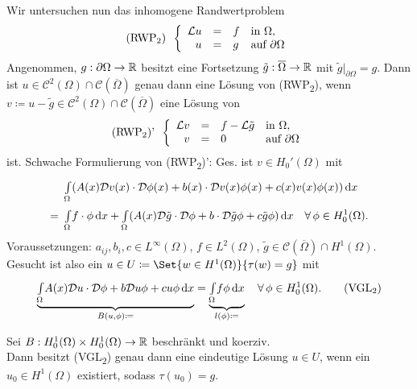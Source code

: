 \documentclass{cheat-sheet}
\newcommand{\Cont}{\mathcal{C}} %
\newcommand{\clos}[1]{\overline{#1}} %
\newcommand{\cOmega}{\clos{\Omega}} %
\newcommand{\bOmega}{\partial \Omega} %
\newcommand{\LL}{\mathcal{L}} %
\newcommand{\tss}[1]{\textsubscript{#1}} %
\newcommand{\DO}{\mathcal{D}} %
\begin{document}
\begin{prob}
  Wir untersuchen nun das inhomogene Randwertproblem
  \[
    \text{(RWP\tss{2})} \enspace
    \left\{ \begin{array}{r c l l}
      \LL u & = & f & \text{in } \Omega, \\
      u & = & g & \text{auf } \bOmega
    \end{array} \right.
  \]
  Angenommen, $g : \bOmega \to \R$ besitzt eine Fortsetzung $\tilde{g} : \cOmega \to \R$ mit $\tilde{g}|_{\bOmega} = g$.
  Dann ist $u \in \Cont^2(\Omega) \cap \Cont(\cOmega)$ genau dann eine Lösung von (RWP\tss{2}), wenn $v \coloneqq u - \tilde{g} \in \Cont^2(\Omega) \cap \Cont(\cOmega)$ eine Lösung von
  \[
    \text{(RWP\tss{2})'} \enspace
    \left\{ \begin{array}{r c l l}
      \LL v & = & f - \LL \tilde{g} & \text{in } \Omega, \\
      v & = & 0 & \text{auf } \bOmega
    \end{array} \right.
  \]
  ist.
  Schwache Formulierung von (RWP\tss{2})':
  Ges. ist $v \in H_0'(\Omega)$ mit
  \begin{align*}
    & \Int{\Omega}{}{(A(x) \DO v(x) \cdot \DO \phi(x) + b(x) \cdot \DO v(x) \phi(x) + c(x) v(x) \phi(x))}{x} \\
    = \enspace & \Int{\Omega}{}{f \cdot \phi}{x} + \Int{\Omega}{}{(A(x) \DO \tilde{g} \cdot \DO \phi + b \cdot \DO \tilde{g} \phi + c \tilde{g} \phi)}{x} \quad
    \forall \, \phi \in H_0^1(\Omega).
  \end{align*}
  Voraussetzungen: $a_{ij}, b_i, c \in L^\infty(\Omega)$, $f \in L^2(\Omega)$, $\tilde{g} \in \Cont(\cOmega) \cap H^1(\Omega)$. \\
  Gesucht ist also ein $u \in U \coloneqq \Set{w \in H^1(\Omega)}{\tau(w) = g}$ mit
  \[
    \underbrace{\Int{\Omega}{}{A(x) \DO u \cdot \DO \phi + b \DO u \phi + c u \phi}{x}}_{B(u, \phi) \coloneqq} =
    \underbrace{\Int{\Omega}{}{f \phi}{x}}_{l(\phi) \coloneqq} \quad
    \forall \, \phi \in H_0^1(\Omega).
    \tag{VGL\tss{2}}
  \]
\end{prob}

\begin{satz}
  Sei $B : H_0^1(\Omega) \times H_0^1(\Omega) \to \mathbb{R}$ beschränkt und koerziv. \\
  Dann besitzt (VGL\tss{2}) genau dann eine eindeutige Lösung $u \in U$, wenn ein $u_0 \in H^1(\Omega)$ existiert, sodass $\tau(u_0) = g$.
\end{satz}
\end{document}
